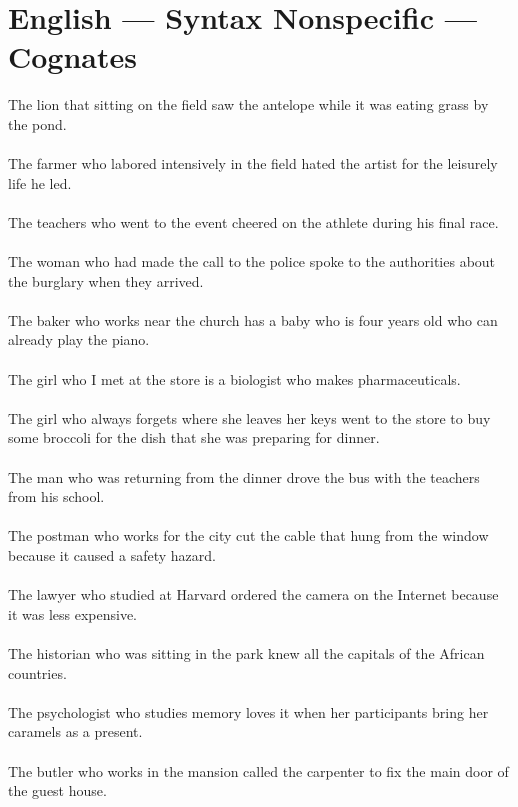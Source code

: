 \label{Appendix::InContext}

\section{English --- Syntax Nonspecific --- Cognates}
The lion that sitting on the field saw the antelope while it was eating grass by the pond.	\\	\\
The farmer who labored intensively in the field hated the artist for the leisurely life he led.	\\	\\
The teachers who went to the event cheered on the athlete during his final race.	\\	\\
The woman who had made the call to the police spoke to the authorities about the burglary when they arrived.	\\	\\
The baker who works near the church has a baby who is four years old who can already play the piano.	\\	\\
The girl who I met at the store is a biologist who makes pharmaceuticals.	\\	\\
The girl who always forgets where she leaves her keys went to the store to buy some broccoli for the dish that she was preparing for dinner.	\\	\\
The man who was returning from the dinner drove the bus with the teachers from his school.	\\	\\
The postman who works for the city cut the cable that hung from the window because it caused a safety hazard.	\\	\\
The lawyer who studied at Harvard ordered the camera on the Internet because it was less expensive.	\\	\\
The historian who was sitting in the park knew all the capitals of the African countries.	\\	\\
The psychologist who studies memory loves it when her participants bring her caramels as a present.	\\	\\
The butler who works in the mansion called the carpenter to fix the main door of the guest house.	\\	\\

